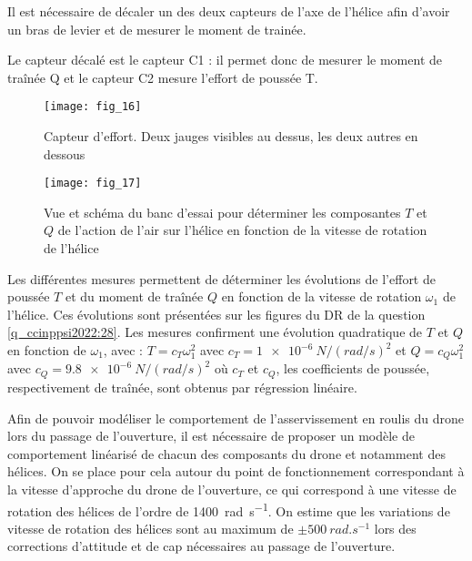 \ifprof
\begin{corrige}
Il est nécessaire de décaler un des deux capteurs de l’axe de l’hélice afin d’avoir un bras de levier et de mesurer le moment de trainée.

Le capteur décalé est le capteur C1 : il permet donc de mesurer le moment de traînée Q et le capteur C2 mesure l’effort de poussée T.
\end{corrige}
\else
\fi

\ifprof
\else
\begin{figure}[H]
\centering
\texttt{[image: fig\_16]}
\caption{\label{fig_ccinppsi2022:16} Capteur d’effort. Deux jauges visibles au dessus, les deux autres en dessous}
\end{figure}

\begin{figure}[H]
\centering
\texttt{[image: fig\_17]}
\caption{\label{fig_ccinppsi2022:17} Vue et schéma du banc d’essai pour déterminer les composantes $T$ et $Q$ de
l’action de l’air sur l’hélice en fonction de la vitesse de rotation de l’hélice}
\end{figure}

Les différentes mesures permettent de déterminer les évolutions de l’effort de poussée $T$ et
du moment de traînée $Q$ en fonction de la vitesse de rotation $\omega_1$ de l’hélice. Ces évolutions
sont présentées sur les figures du DR de la question \ref{q_ccinppsi2022:28}. Les mesures confirment une évolution
quadratique de $T$ et $Q$ en fonction de $\omega_1$, avec :
$T = c_T \omega_1^2$ avec $c_T = \SI{1e-6}{N/(rad/s)^2}$ et
$Q = c_Q \omega_1^2$ avec $c_Q = \SI{9.8e-6}{N/(rad/s)^2}$ 
où $c_T$ et $c_Q$, les coefficients de poussée, respectivement de traînée, sont obtenus par régression linéaire.

Afin de pouvoir modéliser le comportement de l’asservissement en roulis du drone lors du
passage de l’ouverture, il est nécessaire de proposer un modèle de comportement linéarisé
de chacun des composants du drone et notamment des hélices. On se place pour cela autour
du point de fonctionnement correspondant à la vitesse d’approche du drone de l’ouverture,
ce qui correspond à une vitesse de rotation des hélices de l’ordre de \SI{1400}{rad.s^{-1}}. On estime
que les variations de vitesse de rotation des hélices sont au maximum de $\pm \SI{500}{rad.s^{-1}}$ lors
des corrections d’attitude et de cap nécessaires au passage de l’ouverture.
\fi


